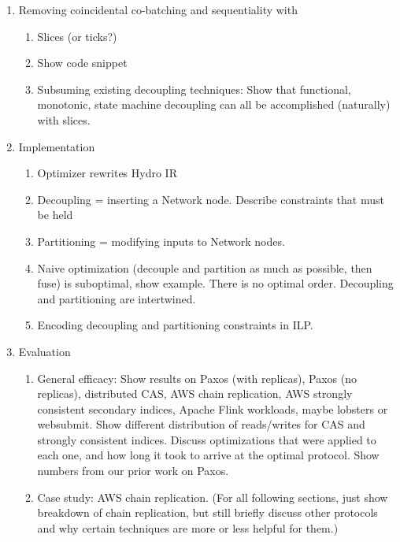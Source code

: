 \begin{enumerate}
\begin{enumerate}
        This is (roughly) the approach that Scalog takes.
      \item Limitations. Mencius and Scalog rely on optimizations specific to consensus; Mencius relies on weakening consistency and Scalog relies on background replication. Our local optimizations are more general but also less performant because they have to maintain linearizability and cannot optimistically replicate (acceptor partitioning is based on slot).
    \end{enumerate}
  \item Removing coincidental co-batching and sequentiality with \hydro{}
    \begin{enumerate}
      \item Slices (or ticks?)
      \item Show code snippet
      \item Subsuming existing decoupling techniques: Show that functional, monotonic, state machine decoupling can all be accomplished (naturally) with slices.
    \end{enumerate}
  \item Implementation
    \begin{enumerate}
      \item Optimizer rewrites Hydro IR
      \item Decoupling = inserting a Network node. Describe constraints that must be held
      \item Partitioning = modifying inputs to Network nodes.
      \item Naive optimization (decouple and partition as much as possible, then fuse) is suboptimal, show example.
        There is no optimal order.
        Decoupling and partitioning are intertwined.
      \item Encoding decoupling and partitioning constraints in ILP.
    \end{enumerate}
  \item Evaluation
    \begin{enumerate}
      \item General efficacy: Show results on Paxos (with replicas), Paxos (no replicas), distributed CAS, AWS chain replication, AWS strongly consistent secondary indices, Apache Flink workloads, maybe lobsters or websubmit.
        Show different distribution of reads/writes for CAS and strongly consistent indices.
        Discuss optimizations that were applied to each one, and how long it took to arrive at the optimal protocol.
        Show numbers from our prior work on Paxos.
      \item Case study: AWS chain replication. (For all following sections, just show breakdown of chain replication, but still briefly discuss other protocols and why certain techniques are more or less helpful for them.)

\end{enumerate}
\end{enumerate}

